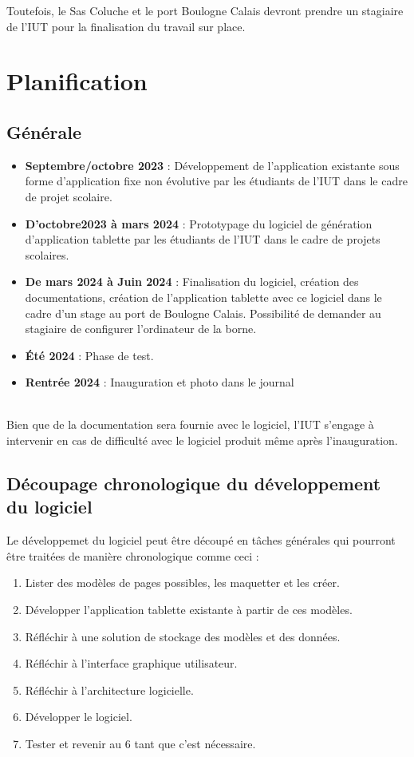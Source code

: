 \documentclass[11pt]{article}
\begin{document}
Toutefois, le Sas Coluche et le port Boulogne Calais devront prendre un stagiaire de l'IUT pour la finalisation du travail sur place.

\section{Planification}
\subsection{Générale}
\begin{itemize}
\item \textbf{Septembre/octobre 2023} : Développement de l'application existante sous forme d'application fixe non évolutive par les étudiants de l'IUT dans le cadre de projet scolaire.
\item \textbf{D'octobre2023 à mars 2024} : Prototypage du logiciel de génération d'application tablette par les étudiants de l'IUT dans le cadre de projets scolaires.
\item \textbf{De mars 2024 à Juin 2024} : Finalisation du logiciel, création des documentations, création de l'application tablette avec ce logiciel dans le cadre d'un stage au port de Boulogne Calais. Possibilité de demander au stagiaire de configurer l'ordinateur de la borne.
\item \textbf{Été 2024} : Phase de test.
\item \textbf{Rentrée 2024} : Inauguration et photo dans le journal \smiley{}
\end{itemize}~\\

Bien que de la documentation sera fournie avec le logiciel, l'IUT s'engage à intervenir en cas de difficulté avec le logiciel produit même après l'inauguration.

\subsection{Découpage chronologique du développement du logiciel}
Le développemet du logiciel peut être découpé en tâches générales qui pourront être traitées de manière chronologique comme ceci :
\begin{enumerate}
\item Lister des modèles de pages possibles, les maquetter et les créer.
\item Développer l'application tablette existante à partir de ces modèles.
\item Réfléchir à une solution de stockage des modèles et des données.
\item Réfléchir à l'interface graphique utilisateur.
\item Réfléchir à l'architecture logicielle.
\item Développer le logiciel.
\item Tester et revenir au 6 tant que c'est nécessaire.
\end{enumerate}
\end{document}
